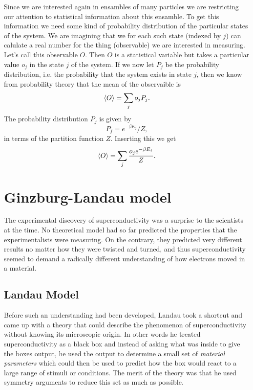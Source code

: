 Since we are interested again in ensambles of many particles we are restricting our attention to statistical
information about this ensamble. To get this information we need some kind of probability distribution of the
particular states of the system. We are imagining that we for each such state (indexed by $j$) can calulate
a real number for the thing (observable) we are interested in measuring. Let's call this observable $O$. Then
$O$ is a statistical variable but takes a particular value $o_j$ in the state $j$ of the system. If we
now let $P_j$ be the probability distribution, i.e. the probability that the system exists in state $j$, then
we know from probability theory that the mean of the observaible is
\begin{equation}
    \label{eq:statMech:statMean}
    \langle O \rangle = \sum_jo_jP_j.
\end{equation}
The probability distribution $P_j$ is given by
\begin{equation}
    \label{eq:statMech:probDist}
    P_j = e^{-\beta E_j}/Z,
\end{equation}
in terms of the partition function $Z$. Inserting this we get
\begin{equation}
    \label{eq:stateMech:statMeanFull}
    \langle O \rangle = \sum_j\frac{o_je^{-\beta E_j}}{Z}.
\end{equation}

\section{Ginzburg-Landau model}

The experimental discovery of superconductivity was a surprise to the scientists at the time. No theoretical model
had so far predicted the properties that the experimentalists were measuring. On the contrary, they predicted
very different results no matter how they were twisted and turned, and thus superconductivity seemed to demand
a radically different understanding of how electrons moved in a material.

\subsection{Landau Model}

Before such an understanding had been developed, Landau took a shortcut and came up with a theory
that could describe the phenomenon of superconductivity without knowing its microscopic origin. In other words
he treated superconductivity as a black box and instead of asking what was inside to give the boxes output,
he used the output to determine a small set of \emph{material parameters} which could then be used to predict
how the box would react to a large range of stimuli or conditions. The merit of the theory was that
he used symmetry arguments to reduce this set as much as possible.

